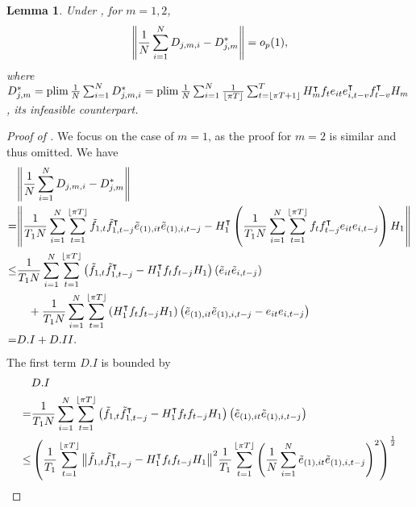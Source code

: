 \documentclass[12pt]{article}
\newtheorem{lemma}{Lemma}
\newcommand*{\tran}{\intercal}
\theoremstyle{plain}
\numberwithin{equation}{section}
\begin{document}
\begin{lemma}
\label{lem:W_pool_gamma}
Under , for $m = 1, 2$,
\begin{align*}
\norm{\frac{1}{N} \sum_{i = 1}^{N} D_{j, m, i} - D^*_{j, m}} = o_p(1),
\end{align*}
where $D^*_{j, m} = \plim \fracN \sumN D^*_{j, m, i} = \plim \fracN \sumN \frac{1}{\floor{\pi T}} \sumTfloort H_m^\tran f_t e_{it} e_{i, t - v}^\tran f_{t - v}^\tran H_m$, its infeasible counterpart. 
\end{lemma}
\begin{proof}[Proof of ]
We focus on the case of $m = 1$, as the proof for $m = 2$ is similar and thus omitted. We have
\begin{align*}
&\norm{
	\fracN \sumN D_{j, m, i} - D^*_{j, m}
} \\
= 
&\norm{
	\frac{1}{T_1 N} \sumN \sumTfloor \tilde{f}_{1, t} \tilde{f}_{1, t - j}^\tran \tilde{e}_{(1), it} \tilde{e}_{(1), i, t - j} - 
	H_1^\tran \left( \frac{1}{T_1 N} \sumN \sumTfloor {f}_t {f}_{t - j}^\tran {e}_{it} {e}_{i, t - j} \right) H_1
} \\
\leq
&\frac{1}{T_1 N} \sumN \sumTfloor \left( \tilde{f}_{1, t} \tilde{f}_{1, t - j}^\tran - H_1^\tran f_t f_{t - j} H_1 \right) \left( \tilde{e}_{it} \tilde{e}_{i, t - j} \right) \\
&\quad +
\frac{1}{T_1 N} \sumN \sumTfloor \left( H_1^\tran f_t f_{t - j} H_1 \right) 
\left( \tilde{e}_{(1), it} \tilde{e}_{(1), i, t - j} - e_{it}e_{i, t - j}\right) \\
= 
&D.I + D.II.
\end{align*}
The first term $D.I$ is bounded by 
\begin{align*}
&D.I \\
= &\frac{1}{T_1 N} \sumN \sumTfloor \left( \tilde{f}_{1, t} \tilde{f}_{1, t - j}^\tran - H_1^\tran f_t f_{t - j} H_1 \right) \left( \tilde{e}_{(1), it} \tilde{e}_{(1), i, t - j} \right) \\
\leq 
&\left( 
	\fracTone \sumTfloor \norm{\tilde{f}_{1, t} \tilde{f}_{1, t - j}^\tran - H_1^\tran f_t f_{t - j} H_1}^2
	\fracTone \sumTfloor \left( \fracN \sumN \tilde{e}_{(1), it} \tilde{e}_{(1), i, t - j} \right)^2
\right)^{\frac{1}{2}} \\

\end{align*}
\end{proof}
\end{document}
